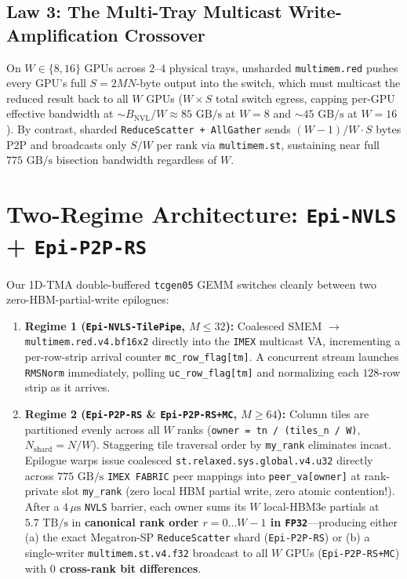 \documentclass[conference,10pt]{IEEEtran}
\begin{document}
\subsection{Law 3: The Multi-Tray Multicast Write-Amplification Crossover}
On $W \in \{8, 16\}$ GPUs across $2$--$4$ physical trays, unsharded \texttt{multimem.red} pushes every GPU's full $S = 2MN$-byte output into the switch, which must multicast the reduced result back to all $W$ GPUs ($W \times S$ total switch egress, capping per-GPU effective bandwidth at $\sim B_{\text{NVL}} / W \approx 85\text{ GB/s}$ at $W{=}8$ and $\sim 45\text{ GB/s}$ at $W{=}16$). By contrast, sharded \texttt{ReduceScatter + AllGather} sends $(W{-}1)/W \cdot S$ bytes P2P and broadcasts only $S/W$ per rank via \texttt{multimem.st}, sustaining near full $775\text{ GB/s}$ bisection bandwidth regardless of $W$.

\section{Two-Regime Architecture: \texttt{Epi-NVLS} + \texttt{Epi-P2P-RS}}

Our 1D-TMA double-buffered \texttt{tcgen05} GEMM switches cleanly between two zero-HBM-partial-write epilogues:
\begin{enumerate}
    \item \textbf{Regime 1 (\texttt{Epi-NVLS-TilePipe}, $M \le 32$):} Coalesced SMEM $\to$ \texttt{multimem.red.v4.bf16x2} directly into the \texttt{IMEX} multicast VA, incrementing a per-row-strip arrival counter \texttt{mc\_row\_flag[tm]}. A concurrent stream launches \texttt{RMSNorm} immediately, polling \texttt{uc\_row\_flag[tm]} and normalizing each $128$-row strip as it arrives.
    \item \textbf{Regime 2 (\texttt{Epi-P2P-RS} \& \texttt{Epi-P2P-RS+MC}, $M \ge 64$):} Column tiles are partitioned evenly across all $W$ ranks (\texttt{owner = tn / (tiles\_n / W)}, $N_{\text{shard}} = N / W$). Staggering tile traversal order by \texttt{my\_rank} eliminates incast. Epilogue warps issue coalesced \texttt{st.relaxed.sys.global.v4.u32} directly across $775\text{ GB/s}$ \texttt{IMEX FABRIC} peer mappings into \texttt{peer\_va[owner]} at rank-private slot \texttt{my\_rank} (zero local HBM partial write, zero atomic contention!). After a $4\,\mu\text{s}$ \texttt{NVLS} barrier, each owner sums its $W$ local-HBM3e partials at $5.7\text{ TB/s}$ in \textbf{canonical rank order $r = 0 \dots W{-}1$ in \texttt{FP32}}---producing either (a) the exact Megatron-SP \texttt{ReduceScatter} shard (\texttt{Epi-P2P-RS}) or (b) a single-writer \texttt{multimem.st.v4.f32} broadcast to all $W$ GPUs (\texttt{Epi-P2P-RS+MC}) with \textbf{$0$ cross-rank bit differences}.
\end{enumerate}
\end{document}
